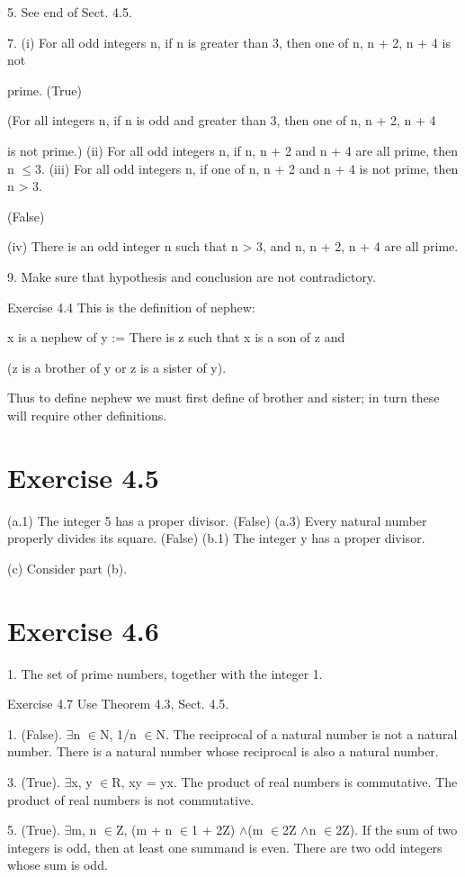\documentclass[11pt]{article}
\theoremstyle{plain}
\theoremstyle{definition}
\begin{document}
5. See end of Sect. 4.5.

7. (i) For all odd integers n, if n is greater than 3, then one of n, n + 2, n + 4 is not

prime. (True)

(For all integers n, if n is odd and greater than 3, then one of n, n + 2, n + 4

is not prime.) (ii) For all odd integers n, if n, n + 2 and n + 4 are all prime, then n $\leq$3. (iii) For all odd integers n, if one of n, n + 2 and n + 4 is not prime, then n > 3.

(False)

(iv) There is an odd integer n such that n > 3, and n, n + 2, n + 4 are all prime.

9. Make sure that hypothesis and conclusion are not contradictory.

Exercise 4.4 This is the definition of nephew:

x is a nephew of y := There is z such that x is a son of z and

(z is a brother of y or z is a sister of y).

Thus to define nephew we must first define of brother and sister; in turn these will require other definitions.

\section{Exercise 4.5}

(a.1) The integer 5 has a proper divisor. (False) (a.3) Every natural number properly divides its square. (False) (b.1) The integer y has a proper divisor.

(c) Consider part (b).

\section{Exercise 4.6}

1. The set of prime numbers, together with the integer 1.

Exercise 4.7 Use Theorem 4.3, Sect. 4.5.

1. (False). $\exists$n $\in$N, 1/n $\in$N. The reciprocal of a natural number is not a natural number. There is a natural number whose reciprocal is also a natural number.

3. (True). $\exists$x, y $\in$R, xy = yx. The product of real numbers is commutative. The product of real numbers is not commutative.

5. (True). $\exists$m, n $\in$Z, (m + n $\in$1 + 2Z) $\land$(m $\in$2Z $\land$n $\in$2Z). If the sum of two integers is odd, then at least one summand is even. There are two odd integers whose sum is odd.
\end{document}
